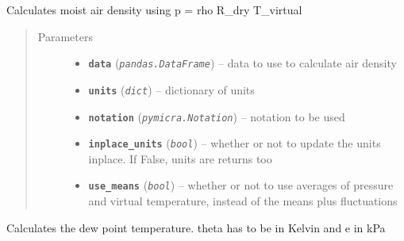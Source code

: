 \documentclass[a4paper,10pt,oneside]{sphinxmanual}
\begin{document}
\begin{fulllineitems}
\label{pymicra:pymicra.physics.airDensity_from_theta_v}
Calculates moist air density using p = rho R\_dry T\_virtual
\begin{quote}\begin{description}
\item[{Parameters}] \leavevmode\begin{itemize}
\item {} 
\textbf{\texttt{data}} (\emph{\texttt{pandas.DataFrame}}) -- data to use to calculate air density

\item {} 
\textbf{\texttt{units}} (\emph{\texttt{dict}}) -- dictionary of units

\item {} 
\textbf{\texttt{notation}} (\emph{\texttt{pymicra.Notation}}) -- notation to be used

\item {} 
\textbf{\texttt{inplace\_units}} (\emph{\texttt{bool}}) -- whether or not to update the units inplace. If False, units are returns too

\item {} 
\textbf{\texttt{use\_means}} (\emph{\texttt{bool}}) -- whether or not to use averages of pressure and virtual temperature, instead of the means plus fluctuations

\end{itemize}

\end{description}\end{quote}

\end{fulllineitems}


\begin{fulllineitems}
\label{pymicra:pymicra.physics.dewPointTemp}
Calculates the dew point temperature.
theta has to be in Kelvin and e in kPa

\end{fulllineitems}

\end{document}
